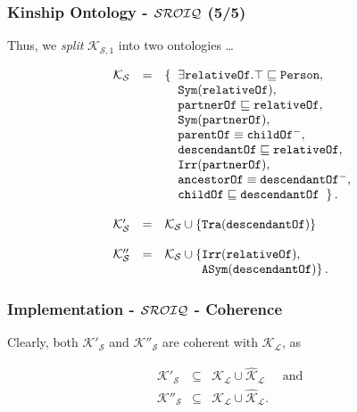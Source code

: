 \documentclass[8pt]{beamer}
\newcommand{\Persons}{\mathtt{Person}}
\newcommand{\relative}{\mathtt{relativeOf}}
\newcommand{\partner}{\mathtt{partnerOf}}
\newcommand{\child}{\mathtt{childOf}}
\newcommand{\parent}{\mathtt{parentOf}}
\newcommand{\ancestor}{\mathtt{ancestorOf}}
\newcommand{\descendant}{\mathtt{descendantOf}}
\newcommand{\KBsets}{\mathcal{K}_{\mathcal{L}}}
\newcommand{\KBlcons}{\widehat{\mathcal{K}}_{\mathcal{L}}}
\newcommand{\KBzeroone}{\mathcal{K}_{\mathcal{S},1}}
\newcommand{\KBzero}{\mathcal{K}_{\mathcal{S}}}
\newcommand{\KBtra}{\mathcal{K}'_{\mathcal{S}}}
\newcommand{\KBirr}{\mathcal{K}''_{\mathcal{S}}}
\begin{document}
\begin{frame}
\frametitle{Kinship Ontology - $\mathcal{SROIQ}$ (5/5) }

Thus, we \emph{split} $\KBzeroone$ into two \sroiq ontologies \ldots

  \begin{small}
  \[  
   \begin{array}{rcl}
    \KBzero & = & \{\;\; \exists\relative.\top \Issub \Persons,\\
    &&\phantom{\{\;\;} \issymmetric{\relative},\\
    &&\phantom{\{\;\;} \partner \Issub \relative,\\
    &&\phantom{\{\;\;} \issymmetric{\partner},\\
    &&\phantom{\{\;\;} \parent \equiv \child^{-},\\
    &&\phantom{\{\;\;} \descendant \Issub \relative, \\
    &&\phantom{\{\;\;} \isirreflexive{\partner},\\
    &&\phantom{\{\;\;} \ancestor\equiv\descendant^{-},\\
    &&\phantom{\{\;\;} \child\Issub\descendant \;\;\}\,.\\
    &&\\
    \KBtra & = & \KBzero \cup \{ \istransitive{\descendant} \} \\
    &&\\
    \KBirr & = & \KBzero \cup \{ \isirreflexive{\relative},\\
    &&\phantom{\KBzero \cup \{}  \isantisymmetric{\descendant} \}\,.
    \end{array}  
  \]
  \end{small}  
\end{frame}

\begin{frame}
\frametitle{Implementation - $\mathcal{SROIQ}$ - Coherence }

Clearly, both $\KBtra$ and $\KBirr$ are coherent with $\KBsets$, as

\[
\begin{array}{rclr}
 \KBtra & \subseteq & \KBsets \cup \KBlcons & \mbox{ and }\\
 \KBirr & \subseteq & \KBsets \cup \KBlcons . 
\end{array}
\]
\end{frame}
\end{document}
